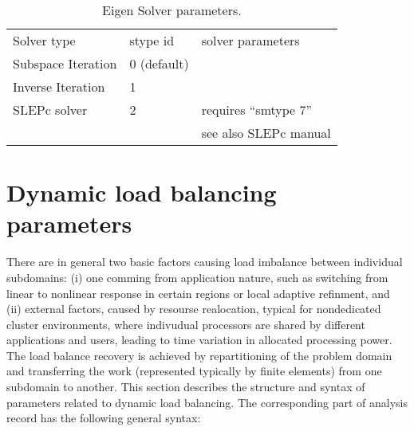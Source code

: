 \documentclass[a4paper]{report}
\newcommand{\Pmode}[1]{{\sffamily #1}}
\begin{document}
\begin{table}[ht]
\begin{center}
\begin{tabular}{|l|l|l|}
\hline
Solver type & stype id & solver parameters \\
Subspace Iteration & 0 (default) & \\
Inverse Iteration& 1 & \\
SLEPc solver& 2 & requires ``smtype 7''\\
&& see also SLEPc manual \\
\hline
\end{tabular}
\caption{Eigen Solver parameters.}
\label{eigenvaluesolverparamtable}
\end{center}
\end{table}


\section{\Pmode{Dynamic load balancing parameters}}
\label{dynamicloadbalancing}
There are in general two basic factors causing load imbalance between individual subdomains: (i) one comming from application nature, such as switching from linear to nonlinear response in certain regions or local adaptive refinment, and (ii) external factors, caused by resourse realocation, typical for nondedicated cluster environments, where indivudual processors are shared by different applications and users, leading to time variation in allocated processing power. The load balance recovery is achieved by repartitioning of the problem domain and transferring the work (represented typically by finite elements) from one subdomain to another.
This section describes the structure and syntax of parameters related to dynamic load balancing.
The corresponding part of analysis record has the following general syntax:\\
\end{document}
